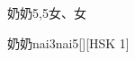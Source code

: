 \begin{entry}{奶奶}{5,5}{⼥、⼥}
  \begin{phonetics}{奶奶}{nai3nai5}[][HSK 1]
  \end{phonetics}
\end{entry}
